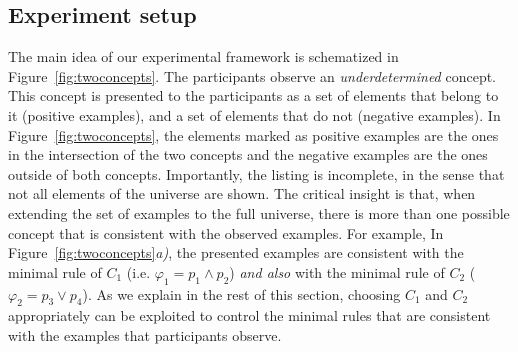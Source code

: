 


\subsection{Experiment setup}\label{Subsec:ExperimentFlow}
The main idea of our experimental framework is schematized in Figure~\ref{fig:twoconcepts}. The participants observe an \textit{underdetermined} concept. This concept is presented to the participants as a set of elements that belong to it (positive examples), and a set of elements that do not (negative examples). In  Figure~\ref{fig:twoconcepts}, the elements marked as positive examples are the ones in the intersection of the two concepts and the negative examples are the ones outside of both concepts. Importantly, the listing is incomplete, in the sense that not all elements of the universe are shown. The critical insight is that, when extending the set of examples to the full universe, there is more than one possible concept that is consistent with the observed examples. For example, In  Figure~\ref{fig:twoconcepts}{\em a)}, the presented examples are consistent with the minimal rule of $C_1$ (i.e. $\varphi_1=p_1\land p_2$) \textit{and also} with the minimal rule of $C_2$ ($\varphi_2=p_3\lor p_4$). As we explain in the rest of this section, choosing $C_1$ and $C_2$ appropriately can be exploited to control the minimal rules that are consistent with the examples that participants observe.


